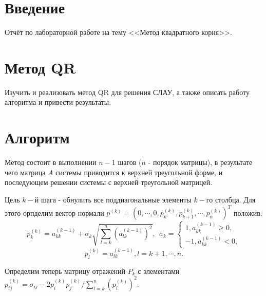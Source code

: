 \documentclass[14pt, titlepage,fleqn]{extarticle}
\begin{document}
	

	
	
	\newpage
	
	\tableofcontents   
	\clearpage
	\section*{Введение}
	Отчёт по лабораторной работе на тему <<Метод квадратного корня>>.	
	\newpage









	\section*{Метод QR}
	Изучить и реализовать метод QR для решения СЛАУ, а также описать работу алгоритма и
	привести результаты.

	\section*{Алгоритм}
	Метод состоит в выполнении $n-1$ шагов ($n$ - порядок матрицы), в результате чего матрица $A$ системы приводится к верхней треугольной форме, и последующем решении системы с верхней треугольной матрицей.
	
	Цель $k-$й шага - обнулить все поддиагональные элементы $k-$го столбца. Для этого орпделим вектор нормали $p^{(k)} = (0, \cdots, 0, p^{(k)}_{k}, p^{(k)}_{k+1}, \cdots, p^{(k)}_{n})^T$ положив:
	\[p^{(k)}_{k} = a^{(k-1)}_{kk} + \sigma_k \sqrt{\sum^{n}_{l=k}(a^{(k-1)}_{lk})^2}, ~~ \sigma_k = \begin{cases}
		1, a^{(k-1)}_{kk} \geq 0,\\
		-1, a^{(k-1)}_{kk} < 0 ,
	\end{cases}\]
	\[p^{(k)}_{l} = a^{(k-1)}_{lk}, l = k + 1, \cdots, n.\]
	
	Определим теперь матрицу отражений $P_k$ с элементами $p^{(k)}_{ij} =\sigma_{ij}- 2p^{(k)}_{i}p^{(k)}_{j}/ \sum^{n}_{l=k}(p^{(k)}_{l})^2.$
\end{document}
